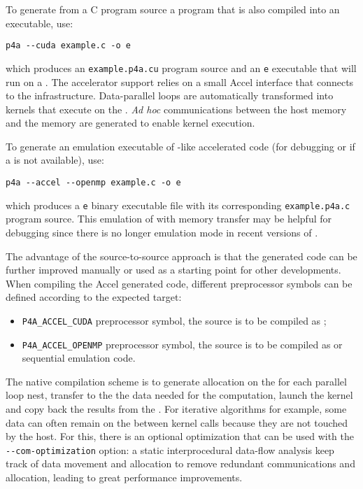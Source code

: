 \documentclass[a4paper]{article}
\begin{document}
To generate from a C program source a \Acuda program that is also compiled
into an executable, use:
\begin{verbatim}
p4a --cuda example.c -o e
\end{verbatim}
which produces an \texttt{example.p4a.cu} \Acuda program source and an
\texttt{e} executable that will run on a \Agpu. The \Agpu accelerator
support relies on a small \Apfa Accel interface that connects to the
\Acuda infrastructure. Data-parallel loops are automatically transformed
into \Acuda kernels that execute on the \Agpu. \emph{Ad
  hoc} communications between the host memory and the \Agpu memory are
generated to enable kernel execution.

To generate an \Aopenmp emulation executable of \Agpu-like accelerated
code (for debugging or if a \Agpu is not available), use:
\begin{verbatim}
p4a --accel --openmp example.c -o e
\end{verbatim}
which produces a \texttt{e} binary executable file with its
corresponding \texttt{example.p4a.c} program source. This \Aopenmp
emulation of \Acuda with memory transfer may be helpful for debugging
since there is no longer emulation mode in recent versions of \Acuda.

The advantage of the source-to-source approach is that the
generated code can be further improved manually or used as a starting
point for other
developments. When compiling the \Apfa Accel generated code,
different preprocessor symbols can be defined according to the expected target:
\begin{itemize}
\item \verb|P4A_ACCEL_CUDA| preprocessor symbol, the source is to be
  compiled as \Acuda;
\item \verb|P4A_ACCEL_OPENMP| preprocessor symbol, the source is to be
  compiled as \Aopenmp or sequential emulation code.
\end{itemize}

The native compilation scheme is to generate allocation on the \Agpu for
each parallel loop nest, transfer to the \Agpu the data needed for the
computation, launch the kernel and copy back the results from the \Agpu.
For iterative algorithms for example, some data can often remain on the
\Agpu between kernel calls because they are not touched by the host. For
this, there is an optional optimization that can be used with the
\verb|--com-optimization| option: a static interprocedural data-flow
analysis keep track of data movement and allocation to remove redundant
communications and allocation, leading to great performance improvements.
\end{document}
